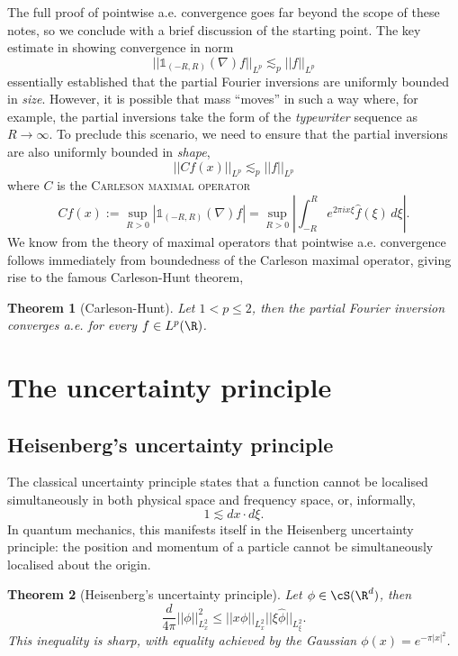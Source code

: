 \documentclass[reqno]{amsart}
\newtheorem{theorem}{Theorem}
\theoremstyle{definition}
\theoremstyle{remark}
\renewcommand{\emph}{\textsc}
\begin{document}
The full proof of pointwise a.e. convergence goes far beyond the scope of these notes, so we conclude with a brief discussion of the starting point. The key estimate in showing convergence in norm 
	\[ || \mathbb 1_{(-R, R)} (\nabla) f||_{L^p} \lesssim_p ||f||_{L^p} \]
essentially established that the partial Fourier inversions are uniformly bounded in \textit{size}. However, it is possible that mass ``moves'' in such a way where, for example, the partial inversions take the form of the \textit{typewriter} sequence as $R \to \infty$. To preclude this scenario, we need to ensure that the partial inversions are also uniformly bounded in \textit{shape}, 
	\[ || C f (x)||_{L^p} \lesssim_p ||f||_{L^p}\]
where $C$ is the \emph{Carleson maximal operator}	 
	\[ Cf (x) := \sup_{R > 0} \left| \mathbb 1_{(-R, R)} (\nabla) f \right| = \sup_{R > 0} \left| \int_{-R}^R e^{2\pi i x\xi} \widehat f(\xi) \, d \xi \right|. \]
We know from the theory of maximal operators that pointwise a.e. convergence follows immediately from boundedness of the Carleson maximal operator, giving rise to the famous Carleson-Hunt theorem, 
	
\begin{theorem}[Carleson-Hunt]
	Let $1 < p \leq 2$, then the partial Fourier inversion converges a.e. for every $f \in L^p (\R)$. 
\end{theorem}

\section{The uncertainty principle}



\subsection{Heisenberg's uncertainty principle}

The classical uncertainty principle states that a function cannot be localised simultaneously in both physical space and frequency space, or, informally, 
	\[ 1 \lesssim d x \cdot d \xi.  \]
In quantum mechanics, this manifests itself in the Heisenberg uncertainty principle: the position and momentum of a particle cannot be simultaneously localised about the origin. 

\begin{theorem}[Heisenberg's uncertainty principle]
	Let $\phi \in \cS (\R^d)$, then 
		\[ \frac{d}{4\pi}||\phi||_{L^2_x}^2 \leq ||x \phi||_{L^2_x} ||\xi\widehat \phi||_{L^2_\xi}. \]
	This inequality is sharp, with equality achieved by the Gaussian $\phi(x) = e^{-\pi |x|^2}$. 	
\end{theorem}
\end{document}
